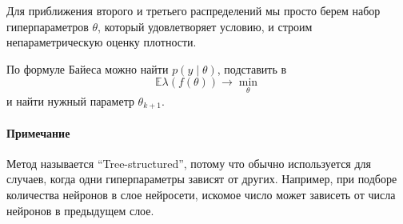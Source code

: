 \documentclass[12pt, fleqn]{article}
\begin{document}
Для приближения второго и третьего распределений мы просто берем набор гиперпараметров $\theta$, который удовлетворяет условию, и строим непараметрическую оценку плотности.

По формуле Байеса можно найти $p(y \mid \theta)$, подставить в
\[
	\mathbb{E} \lambda (f(\theta)) \to \min\limits_{\theta}
\]
и найти нужный параметр $\theta_{k + 1}$.

\paragraph{Примечание} Метод называется \enquote{Tree-structured}, потому что обычно используется для случаев, когда одни гиперпараметры зависят от других.
Например, при подборе количества нейронов в слое нейросети, искомое число может зависеть от числа нейронов в предыдущем слое.
\end{document}
